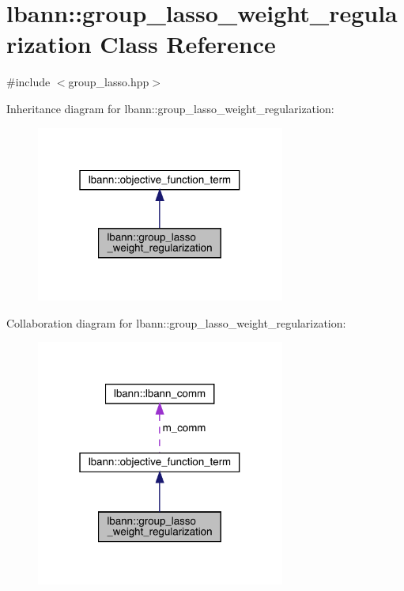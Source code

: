 \hypertarget{classlbann_1_1group__lasso__weight__regularization}{}\section{lbann\+:\+:group\+\_\+lasso\+\_\+weight\+\_\+regularization Class Reference}
\label{classlbann_1_1group__lasso__weight__regularization}


{\ttfamily \#include $<$group\+\_\+lasso.\+hpp$>$}



Inheritance diagram for lbann\+:\+:group\+\_\+lasso\+\_\+weight\+\_\+regularization\+:\nopagebreak
\begin{figure}[H]
\begin{center}
\leavevmode
\includegraphics[width=232pt]{classlbann_1_1group__lasso__weight__regularization__inherit__graph}
\end{center}
\end{figure}


Collaboration diagram for lbann\+:\+:group\+\_\+lasso\+\_\+weight\+\_\+regularization\+:\nopagebreak
\begin{figure}[H]
\begin{center}
\leavevmode
\includegraphics[width=232pt]{classlbann_1_1group__lasso__weight__regularization__coll__graph}
\end{center}
\end{figure}
